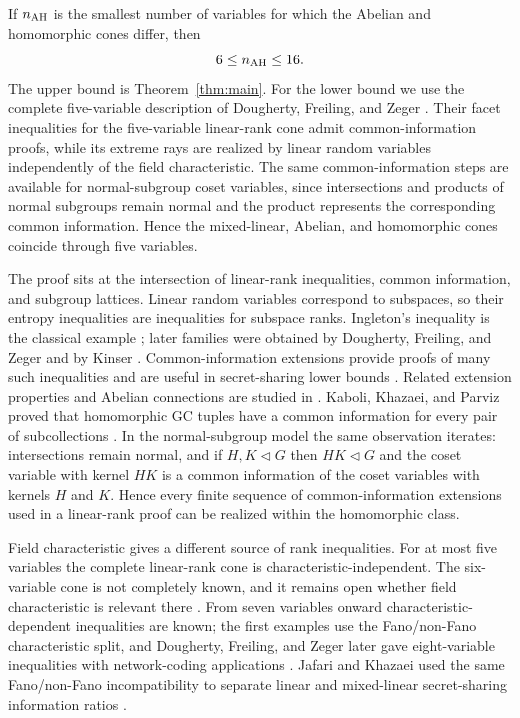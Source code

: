 \documentclass[journal]{IEEEtran}
\begin{document}
If $n_{\rm AH}$ is the smallest number of variables for which the Abelian and
homomorphic cones differ, then
\[
  6\le n_{\rm AH}\le16.
\]
The upper bound is Theorem~\ref{thm:main}.  For the lower bound we use the
complete five-variable description of Dougherty, Freiling, and Zeger
\cite{DFZLinearRank}.  Their facet inequalities for the five-variable
linear-rank cone admit common-information proofs, while its extreme rays are
realized by linear random variables independently of the field characteristic.
The same common-information steps are available for normal-subgroup coset
variables, since intersections and products of normal subgroups remain normal
and the product represents the corresponding common information.  Hence the
mixed-linear, Abelian, and homomorphic cones coincide through five variables.

The proof sits at the intersection of linear-rank inequalities, common
information, and subgroup lattices.  Linear random variables correspond to
subspaces, so their entropy inequalities are inequalities for subspace ranks.
Ingleton's inequality is the classical example \cite{Ingleton1971}; later
families were obtained by Dougherty, Freiling, and Zeger and by Kinser
\cite{DFZLinearRank,Kinser2011}.  Common-information extensions provide proofs
of many such inequalities and are useful in secret-sharing lower bounds
\cite{MartinPadroYang2016,FarrasEtAl2020,BamiloshinEtAl2021}.  Related
extension properties and Abelian connections are studied in
\cite{BamiloshinFarrasPadro2025,MejiaMontoya2022}.  Kaboli, Khazaei, and Parviz proved that homomorphic GC tuples have a common
information for every pair of subcollections
\cite[Cor.~6.3]{KaboliKhazaeiParviz2021}.  In the normal-subgroup model the same
observation iterates: intersections remain normal, and if $H,K\triangleleft G$
then $HK\triangleleft G$ and the coset variable with kernel $HK$ is a common
information of the coset variables with kernels $H$ and $K$.  Hence every
finite sequence of common-information extensions used in a linear-rank proof
can be realized within the homomorphic class.

Field characteristic gives a different source of rank inequalities.  For at
most five variables the complete linear-rank cone is characteristic-independent.
The six-variable cone is not completely known, and it remains open whether
field characteristic is relevant there \cite{Dougherty2014Six}.  From seven
variables onward characteristic-dependent inequalities are known; the first
examples use the Fano/non-Fano characteristic split, and Dougherty, Freiling,
and Zeger later gave eight-variable inequalities with network-coding
applications \cite{BlasiakKleinbergLubetzky2011,DFZ2015Characteristic}.
Jafari and Khazaei used the same Fano/non-Fano incompatibility to separate
linear and mixed-linear secret-sharing information ratios
\cite{JafariKhazaei2021}.
\end{document}
